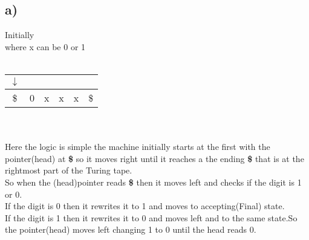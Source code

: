 \documentclass{article}
\begin{document}
\subsection*{a)}
Initially \\
where x can be 0 or 1 \\\\
\begin{tabular}{|c|c|c|c|c|c|}
     $\downarrow$\\
     \hline
     \$ & 0 & x & x & x &\$  \\
     \hline
\end{tabular}\\\\
Here the logic is simple the machine initially starts at the first with the pointer(head) at \textbf{\$} so it moves right until it reaches a the ending \textbf{\$} that is at the rightmost part of the Turing tape.\\
So when the (head)pointer reads \textbf{\$} then it moves left and checks if the digit is 1 or 0.\\
If the digit is 0 then it rewrites it to 1 and moves to accepting(Final) state.\\
If the digit is 1 then it rewrites it to 0 and moves left and to the same state.So the pointer(head) moves left changing 1 to 0 until the head reads 0.\\

\end{document}
